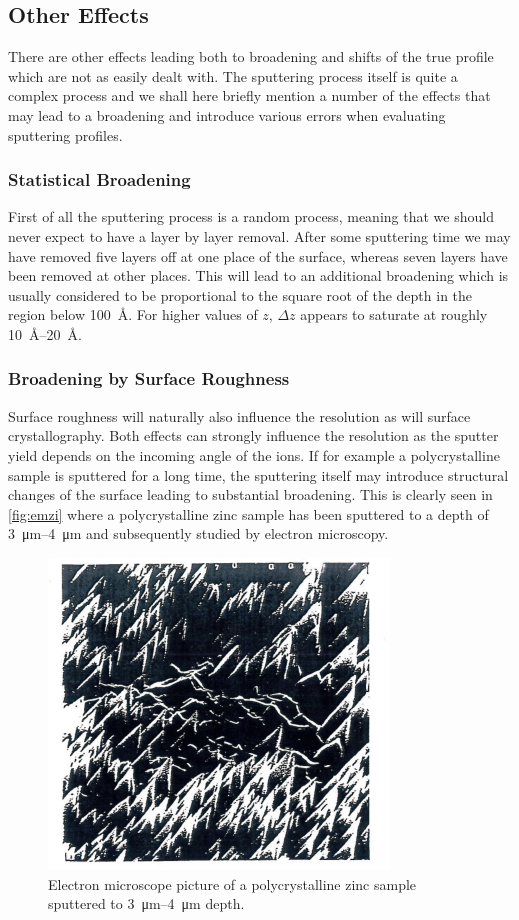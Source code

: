 \subsection{Other Effects}
There are other effects leading both to broadening and shifts of the true profile which are not as easily dealt with. The sputtering process itself is quite a complex process and we shall here briefly mention a number of the effects that may lead to a broadening and introduce various errors when evaluating sputtering profiles.

\subsubsection{Statistical Broadening}
First of all the sputtering process is a random process, meaning that we should never expect to have a layer by layer removal. After some sputtering time we may have removed five layers off at one place of the surface, whereas seven layers have been removed at other places. This will lead to an additional broadening which is usually considered to be proportional to the square root of the depth in the region below \SI{100}{\angstrom}. For higher values of $z$, $\Delta z$ appears to saturate at roughly \SIrange{10}{20}{\angstrom}.

\subsubsection{Broadening by Surface Roughness}
Surface roughness will naturally also influence the resolution as will surface crystallography. Both effects can strongly influence the resolution as the sputter yield depends on the incoming angle of the ions. If for example a polycrystalline sample is sputtered for a long time, the sputtering itself may introduce structural changes of the surface leading to substantial broadening. This is clearly seen in \autoref{fig:emzi} where a polycrystalline zinc sample has been sputtered to a depth of \SIrange{3}{4}{\micro m} and subsequently studied by electron microscopy.

\begin{figure}[h!]
	\begin{center}
	\includegraphics[scale=4]{figures/07_06.png}
	\caption{Electron microscope picture of a
 polycrystalline zinc sample sputtered to \SIrange{3}{4}{\micro m} depth.}
	\label{fig:emzi}
	\end{center}
\end{figure}

